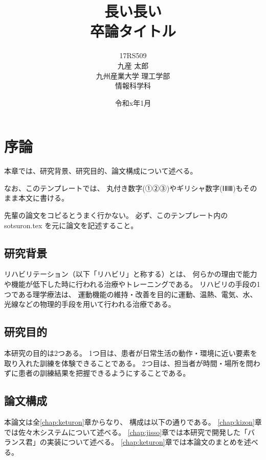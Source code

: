 \documentclass[uplatex,a4paper,12pt]{jsreport}
\title{
 \Huge{長い長い\\卒論タイトル} 
 \vspace{3.5cm}\\
}
\author{
 \LARGE{17RS509}\vspace{0.5cm}\\
 \LARGE{九産 太郎}\vspace{2cm}\\
 \LARGE{九州産業大学 理工学部}\vspace{0.5cm}\\
 \LARGE{情報科学科}\vspace{1cm}\\
}
\date{\LARGE{令和x年1月}}
\begin{document}
\maketitle
\setcounter{page}{0}
\tableofcontents
\listoffigures
\listoftables
\clearpage
\setcounter{page}{0}


\chapter{序論}\label{chap:joron}
本章では、研究背景、研究目的、論文構成について述べる。

なお、このテンプレートでは、
丸付き数字(①②③)やギリシャ数字(ⅠⅡⅢ)もそのまま本文に書ける。

先輩の論文をコピるとうまく行かない。
必ず、このテンプレート内の sotsuron.tex を元に論文を記述すること。

\section{研究背景}\label{sec:haikei}

リハビリテーション（以下「リハビリ」と称する）とは、
何らかの理由で能力や機能が低下した時に行われる治療やトレーニングである。
リハビリの手段の1つである理学療法は、
運動機能の維持・改善を目的に運動、温熱、電気、水、
光線などの物理的手段を用いて行われる治療である\cite{igaku}。%
    
\section{研究目的}\label{sec:mokuteki}

本研究の目的は2つある。
1つ目は、患者が日常生活の動作・環境に近い要素を取り入れた訓練を体験できることである。
2つ目は、担当者が時間・場所を問わずに患者の訓練結果を把握できるようにすることである。
  
\section{論文構成}\label{sec:kousei}

本論文は全\ref{chap:keturon}章からなり、
構成は以下の通りである。
\ref{chap:kizon}章では佐々木システムについて述べる。
\ref{chap:jisso}章では本研究で開発した「バランス君」の実装について述べる。
\ref{chap:keturon}章では本論文のまとめを述べる。
\end{document}
